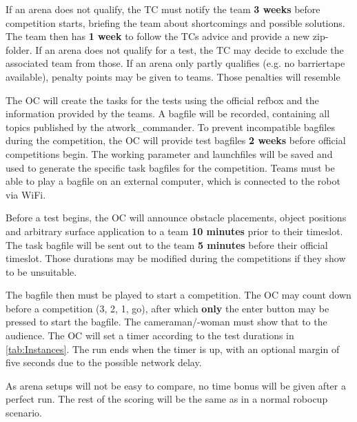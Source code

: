 If an arena does not qualify, the TC must notify the team \textbf{3 weeks} before competition starts, 
briefing the team about shortcomings and possible solutions. 
The team then has \textbf{1 week} to follow the TCs advice and provide a new zip-folder.
If an arena does not qualify for a test, the TC may decide to exclude the associated team from those.
If an arena only partly qualifies (e.g. no barriertape available), penalty points may be given to teams.
Those penalties will resemble 

The OC will create the tasks for the tests using the official refbox and the information provided by the teams. 
A bagfile will be recorded, containing all topics published by the atwork\_commander.
To prevent incompatible bagfiles during the competition, 
the OC will provide test bagfiles \textbf{2 weeks} before official competitions begin.
The working parameter and launchfiles will be saved and used to generate the specific task bagfiles for the competition.
Teams must be able to play a bagfile on an external computer, which is connected to the robot via WiFi.

Before a test begins, the OC will announce obstacle placements, object positions and arbitrary surface application to a team \textbf{10 minutes} prior to their timeslot. The task bagfile will be sent out to the team \textbf{5 minutes}  before their official timeslot. 
Those durations may be modified during the competitions if they show to be unsuitable.

The bagfile then must be played to start a competition. 
The OC may count down before a competition (3, 2, 1, go), after which \textbf{only} the enter button may be pressed to start the bagfile. 
The cameraman/-woman must show that to the audience.
The OC will set a timer according to the test durations in \ref{tab:Instances}. 
The run ends when the timer is up, with an optional margin of five seconds due to the possible network delay.

As arena setups will not be easy to compare, no time bonus will be given after a perfect run. 
The rest of the scoring will be the same as in a normal robocup scenario.
